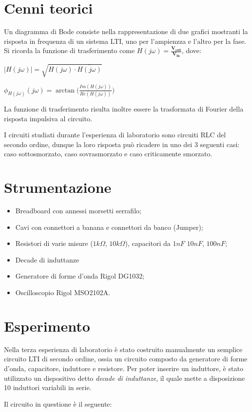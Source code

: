    \section{Cenni teorici}
    Un diagramma di Bode consiste nella rappresentazione di due grafici mostranti la risposta in frequenza di un sistema LTI, 
    uno per l'ampienzza e l'altro per la fase.
    Si ricorda la funzione di trasferimento come $H(j\omega) = \frac{\mathbf{V_{out}}}{\mathbf{V_{in}}}$, dove:\par 
    $\left\lvert H(j\omega) \right\rvert = \sqrt{H(j\omega) \cdot \overline{H(j\omega)}} $\par
    $\phi_{H(j\omega)}(j\omega) = \arctan \bigl(\frac{Im(H(j\omega))}{Re(H(j\omega))} \bigr)$ \par
    La funzione di trasferimento risulta inoltre essere la trasformata di Fourier della risposta impulsiva al circuito.
    \par I circuiti studiati durante l'esperienza di laboratorio sono circuiti RLC del secondo ordine, dunque la loro risposta può
    ricadere in uno dei 3 seguenti casi: caso sottosmorzato, caso sovrasmorzato e caso criticamente smorzato.

    \section{Strumentazione}
    \begin{itemize}
        \item Breadboard con annessi morsetti serrafilo;
        \item Cavi con connettori a banana e connettori da banco (Jumper);
        \item Resistori di varie misure ($1k\Omega$, $10k\Omega$), capacitori da $1nF$ $10nF$, $100nF$;
        \item Decade di induttanze
        \item Generatore di forme d'onda Rigol DG1032;
        \item Oscilloscopio Rigol MSO2102A.
    \end{itemize}

    \newpage

    \section{Esperimento}
    Nella terza esperienza di laboratorio è stato costruito manualmente un semplice circuito LTI di secondo ordine, ossia
    un circuito composto da generatore di forme d'onda, capacitore, induttore e resistore. Per poter inserire un induttore, è stato utilizzato un dispositivo
    detto \textit{decade di induttanze}, il quale mette a disposizione 10 induttori variabili in serie. \par
    Il circuito in questione è il seguente:

